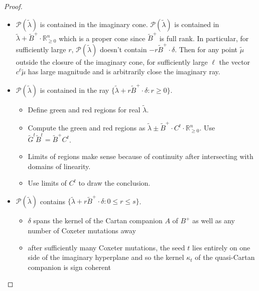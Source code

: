 \documentclass{amsart}
\numberwithin{theorem}{section}
\newcommand{\cP}{\mathcal{P}}
\newcommand{\RR}{\mathbb{R}}
\begin{document}
  \begin{proof}
    \begin{itemize}
      \item $\cP(\tilde\lambda)$ is contained in the imaginary cone.
        $\cP(\tilde\lambda)$ is contained in $\tilde\lambda + \widetilde B^+ \cdot \RR_{\ge0}^n$ which is a proper cone since $\widetilde B^+$ is full rank.
        In particular, for sufficiently large $r$, $\cP(\tilde\lambda)$ doesn't contain $-r \widetilde B^+\cdot \delta$.
        Then for any point $\tilde\mu$ outside the closure of the imaginary cone, for sufficiently large $\ell$ the vector $c^\ell \tilde\mu$ has large magnitude and is arbitrarily close the imaginary ray.
      \item $\cP(\tilde\lambda)$ is contained in the ray $\{\tilde\lambda+r\widetilde B^+\cdot\delta:r\ge 0\}$.
        \begin{itemize}
          \item Define green and red regions for real $\tilde\lambda$.
          \item Compute the green and red regions as $\tilde\lambda \pm \widetilde B^+\cdot C^t\cdot \RR_{\ge0}^n$.
            Use $\widetilde G^t\widetilde B^t = \widetilde B^+ C^t$.
          \item Limits of regions make sense because of continuity after intersecting with domains of linearity.
          \item Use limits of $C^t$ to draw the conclusion.
        \end{itemize}
      \item $\cP(\tilde\lambda)$ contains $\{\tilde\lambda+r\widetilde B^+\cdot\delta:0\le r\le s\}$.
        \begin{itemize}
          \item $\delta$ spans the kernel of the Cartan companion $A$ of $B^+$ as well as any number of Coxeter mutations away
          \item after sufficiently many Coxeter mutations, the seed $t$ lies entirely on one side of the imaginary hyperplane and so the kernel $\kappa_t$ of the quasi-Cartan companion is sign coherent


\end{itemize}
\end{itemize}
\end{proof}
\end{document}
